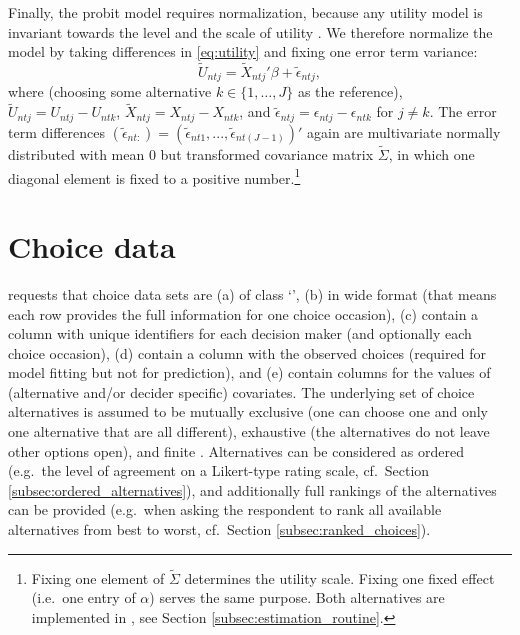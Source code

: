 \documentclass[article,shortnames]{jss}
\newcommand{\class}[1]{`\code{#1}'}
\begin{document}
Finally, the probit model requires normalization, because any utility model is invariant towards the level and the scale of utility \citep[Ch.\ 2]{Train:2009}. We therefore normalize the model by taking differences in \eqref{eq:utility} and fixing one error term variance:
\begin{equation}
\label{eq:utility_diff}
\tilde{U}_{ntj} = \tilde{X}_{ntj}' \beta + \tilde{\epsilon}_{ntj},
\end{equation}
where (choosing some alternative $k \in \{1,\dots,J\}$ as the reference), $\tilde{U}_{ntj} = U_{ntj} - U_{ntk}$, $\tilde{X}_{ntj} = X_{ntj} - X_{ntk}$, and $\tilde{\epsilon}_{ntj} = \epsilon_{ntj} - \epsilon_{ntk}$ for $j\neq k$. The error term differences $(\tilde{\epsilon}_{nt:}) = (\tilde{\epsilon}_{nt1},...,\tilde{\epsilon}_{nt(J-1)})'$ again are multivariate normally distributed with mean 0 but transformed covariance matrix $\tilde{\Sigma}$, in which one diagonal element is fixed to a positive number.\footnote{Fixing one element of $\tilde{\Sigma}$ determines the utility scale. Fixing one fixed effect (i.e.\ one entry of $\alpha$) serves the same purpose. Both alternatives are implemented in , see Section \ref{subsec:estimation_routine}.}

\section{Choice data} \label{sec:choice_data}

 requests that choice data sets are (a) of class \class{data.frame}, (b) in wide format (that means each row provides the full information for one choice occasion), (c) contain a column with unique identifiers for each decision maker (and optionally each choice occasion), (d) contain a column with the observed choices (required for model fitting but not for prediction), and (e) contain columns for the values of (alternative and/or decider specific) covariates. The underlying set of choice alternatives is assumed to be mutually exclusive (one can choose one and only one alternative that are all different), exhaustive (the alternatives do not leave other options open), and finite \citep[Ch.\ 2]{Train:2009}. Alternatives can be considered as ordered (e.g.\ the level of agreement on a Likert-type rating scale, cf.\ Section \ref{subsec:ordered_alternatives}), and additionally full rankings of the alternatives can be provided (e.g.\ when asking the respondent to rank all available alternatives from best to worst, cf.\ Section \ref{subsec:ranked_choices}).
\end{document}
